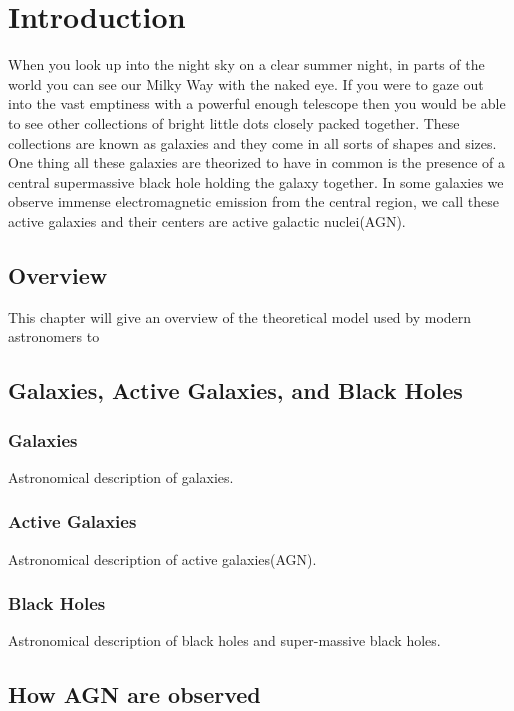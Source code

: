 \documentclass[12pt, oneside]{smuthesis}
\begin{document}
\chapter{\sc Introduction}

When you look up into the night sky on a clear summer night, in parts of the world you can see our Milky Way with the naked eye. If you were to gaze out into the vast emptiness with a powerful enough telescope then you would be able to see other collections of bright little dots closely packed together. These collections are known as galaxies and they come in all sorts of shapes and sizes. One thing all these galaxies are theorized to have in common is the presence of a central supermassive black hole holding the galaxy together. In some galaxies we observe immense electromagnetic emission from the central region, we call these active galaxies and their centers are active galactic nuclei(AGN).

\section{\sc Overview}

This chapter will give an overview of the theoretical model used by modern astronomers to 

\section{\sc Galaxies, Active Galaxies, and Black Holes}

\subsection{\sc Galaxies}

Astronomical description of galaxies.

\subsection{\sc Active Galaxies}

Astronomical description of active galaxies(AGN).

\subsection{\sc Black Holes}

Astronomical description of black holes and super-massive black holes.


\section{\sc How AGN are observed}
\end{document}
